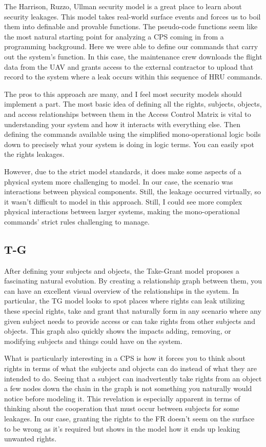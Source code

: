 \documentclass[10pt,journal,compsoc]{IEEEtran}
\begin{document}
The Harrison, Ruzzo, Ullman security model is a great place to learn about security leakages. This model takes real-world surface events and forces us to boil them into definable and provable functions. The pseudo-code functions seem like the most natural starting point for analyzing a CPS coming in from a programming background. Here we were able to define our commands that carry out the system's function. In this case, the maintenance crew downloads the flight data from the UAV and grants access to the external contractor to upload that record to the system where a leak occurs within this sequence of HRU commands. 

The pros to this approach are many, and I feel most security models should implement a part. The most basic idea of defining all the rights, subjects, objects, and access relationships between them in the Access Control Matrix is vital to understanding your system and how it interacts with everything else. Then defining the commands available using the simplified mono-operational logic boils down to precisely what your system is doing in logic terms. You can easily spot the rights leakages. 

However, due to the strict model standards, it does make some aspects of a physical system more challenging to model. In our case, the scenario was interactions between physical components. Still, the leakage occurred virtually, so it wasn't difficult to model in this approach. Still, I could see more complex physical interactions between larger systems, making the mono-operational commands' strict rules challenging to manage. 

\subsection{T-G}

After defining your subjects and objects, the Take-Grant model proposes a fascinating natural evolution. By creating a relationship graph between them, you can have an excellent visual overview of the relationships in the system. In particular, the TG model looks to spot places where rights can leak utilizing these special rights, take and grant that naturally form in any scenario where any given subject needs to provide access or can take rights from other subjects and objects. This graph also quickly shows the impacts adding, removing, or modifying subjects and things could have on the system.

What is particularly interesting in a CPS is how it forces you to think about rights in terms of what the subjects and objects can do instead of what they are intended to do. Seeing that a subject can inadvertently take rights from an object a few nodes down the chain in the graph is not something you naturally would notice before modeling it. This revelation is especially apparent in terms of thinking about the cooperation that must occur between subjects for some leakages. In our case, granting the rights to the FR doesn't seem on the surface to be wrong as it's required but shows in the model how it ends up leaking unwanted rights. 
\end{document}
